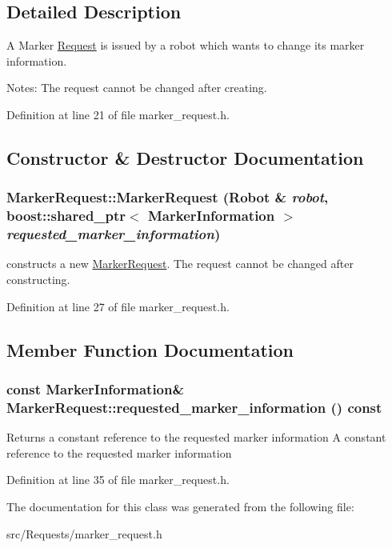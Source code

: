 \subsection{Detailed Description}
A Marker \hyperlink{class_request}{Request} is issued by a robot which wants to change its marker information. 

Notes: The request cannot be changed after creating. 

Definition at line 21 of file marker\_\-request.h.

\subsection{Constructor \& Destructor Documentation}
\hypertarget{class_marker_request_70e6f1fa26f348ec9cfc8e9880a4bb29}{
\subsubsection[MarkerRequest]{\setlength{\rightskip}{0pt plus 5cm}MarkerRequest::MarkerRequest (Robot \& {\em robot}, \/  boost::shared\_\-ptr$<$ {\bf MarkerInformation} $>$ {\em requested\_\-marker\_\-information})}}
\label{class_marker_request_70e6f1fa26f348ec9cfc8e9880a4bb29}


constructs a new \hyperlink{class_marker_request}{MarkerRequest}. The request cannot be changed after constructing. 

Definition at line 27 of file marker\_\-request.h.

\subsection{Member Function Documentation}
\hypertarget{class_marker_request_709617b7716a3f5305782bc18067d357}{
\subsubsection[requested\_\-marker\_\-information]{\setlength{\rightskip}{0pt plus 5cm}const {\bf MarkerInformation}\& MarkerRequest::requested\_\-marker\_\-information () const}}
\label{class_marker_request_709617b7716a3f5305782bc18067d357}


Returns a constant reference to the requested marker information  A constant reference to the requested marker information 

Definition at line 35 of file marker\_\-request.h.

The documentation for this class was generated from the following file:\begin{CompactItemize}
\item 
src/Requests/marker\_\-request.h\end{CompactItemize}
